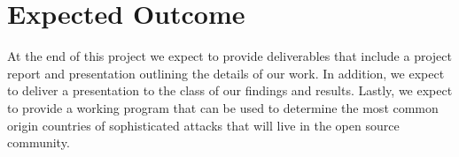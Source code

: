 \documentclass[letterpaper, 10 pt, conference]{ieeeconf}  %
\begin{document}
\section{Expected Outcome}

At the end of this project we expect to provide deliverables that include a project report and presentation outlining the details of our work. 
In addition, we expect to deliver a presentation to the class of our findings and results. 
Lastly, we expect to provide a working program that can be used to determine the most common origin countries of sophisticated attacks that will live in the open source community. 
\end{document}
